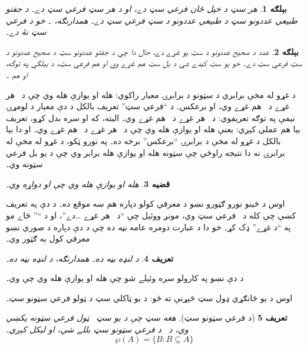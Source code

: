 \documentclass[12pt,a4paper,oneside]{report}
\newcommand{\Setabs}[2]{\{#1 : #2\}}
\newcommand{\Pow}[1]{\wp(#1)}
\newcommand{\lif}{\mathbin{\rightarrow}}
\newcommand{\ollabel}[1]{\label{\pspart:\pschapter:\pssection:#1}}
\newtheorem{defn}{تعريف}[section]
\newtheorem{ex}[defn]{بېلګه}
\newtheorem{prop}[defn]{قضيه}
\begin{document}
\begin{ex}
هر سټ د خپل ځان فرعي سټ دے، او \LR{$\emptyset$} د هر سټ فرعي سټ دے۔ د جفتو طبيعي عددونو سټ د طبيعي عددونو د سټ فرعي سټ دے۔ همدارنګه، ۔ خو  د  فرعي سټ نۀ دے۔
\end{ex}

\begin{ex}
عدد  د صحيح عددونو د سټ يو غړے دے، حال دا چې د جفتو عددونو سټ د صحيح عددونو د سټ فرعي سټ دے۔ خو يو سټ کېدے شي د بل سټ \emph{هم} غړے وي او هم فرعي سټ، د بېلګې په توګه،  او هم ۔
\end{ex}

د غړو له مخې برابري د سټونو د برابرۍ معيار راکوي:  هله او يوازې هله وي چې د~ هر غړے د~ هم غړے وي، او برعکس۔ د ``فرعي سټ'' تعريف  بالکل د دې معيار د لومړۍ نيمې په توګه تعريفوي: د~ هر غړے د~ هم غړے وي۔ البته، که  او  سره بدل کړو، تعريف بيا هم عملي کېږي: يعنې  هله او يوازې هله وي چې د~ هر غړے د~ هم غړے وي۔ او دا بيا بالکل د غړو له مخې د برابرۍ ``برعکس'' برخه ده۔ په نورو ټکو، د غړو له مخې له برابرۍ نه دا نتيجه راوځي چې سټونه هله او يوازې هله برابر وي چې د يو بل فرعي سټونه وي۔

\begin{prop}
 هله او يوازې هله وي چې  او  دواړه وي۔
\end{prop}

اوس د ځينو نورو ګټورو نښو د معرفي کولو دپاره هم ښه موقع ده۔ د دې په تعريف کښې چې  کله د~ فرعي سټ وي، مونږ ووئيل چې ``د~ هر غړے \dots دے''، او د ``\LR{$\dots$}'' ځاے مو په ``د  غړے'' ډک کړ۔ خو دا د عبارت دومره عامه \emph{بڼه} ده چې د دې دپاره د صوري نښو معرفي کول به ګټور وي۔

\begin{defn}\ollabel{forallxina}
 د \LR{$\forall x(x \in A \lif \phi)$} لنډه بڼه ده۔ همدارنګه،  د  لنډه بڼه ده۔
\end{defn}

د دې نښو په کارولو سره وئيلے شو چې  هله او يوازې هله وي چې  وي۔

اوس د يو ځانګړي ډول سټ څېړنې ته ځو: د يو ټاکلي سټ د ټولو فرعي سټونو سټ۔

\begin{defn}[د فرعي سټونو سټ]
هغه سټ چې د يو سټ~ ټول فرعي سټونه پکښې وي، د~ \emph{د فرعي سټونو سټ} بللے شي، او \LR{$\Pow{A}$} ليکل کېږي۔
  \[
    \Pow{A} = \Setabs{B}{B \subseteq A}
  \]
\end{defn}
\end{document}
